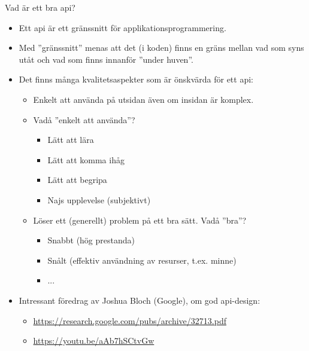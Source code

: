 \begin{Slide}{Vad är ett bra api?}
\begin{itemize}\SlideFontSmall
  \item Ett api  är ett gränssnitt för applikationsprogrammering.
  \item Med ''gränssnitt'' menas att det (i koden) finns en gräns mellan vad som syns utåt och vad som finns innanför ''under huven''.
  \item Det finns många kvalitetsaspekter som är önskvärda för ett api: \pause
\begin{itemize}\SlideFontSmall
  \item Enkelt att använda på utsidan även om insidan är komplex.
  \item Vadå ''enkelt att använda''?
  \begin{itemize}\SlideFontTiny
  \item Lätt att lära
  \item Lätt att komma ihåg
  \item Lätt att begripa
  \item Najs upplevelse (subjektivt)
  \end{itemize}  
  \item Löser ett (generellt) problem på ett bra sätt. Vadå ''bra''?
  \begin{itemize}\SlideFontTiny
    \item Snabbt (hög prestanda)
    \item Snålt (effektiv användning av resurser, t.ex. minne)
    \item ...
  \end{itemize}  
\end{itemize}
\item Intressant föredrag av Joshua Bloch (Google), om god api-design:
   \begin{itemize}\SlideFontTiny
\item
\url{https://research.google.com/pubs/archive/32713.pdf}
\item \url{https://youtu.be/aAb7hSCtvGw}
\end{itemize}
\end{itemize}
\end{Slide}

